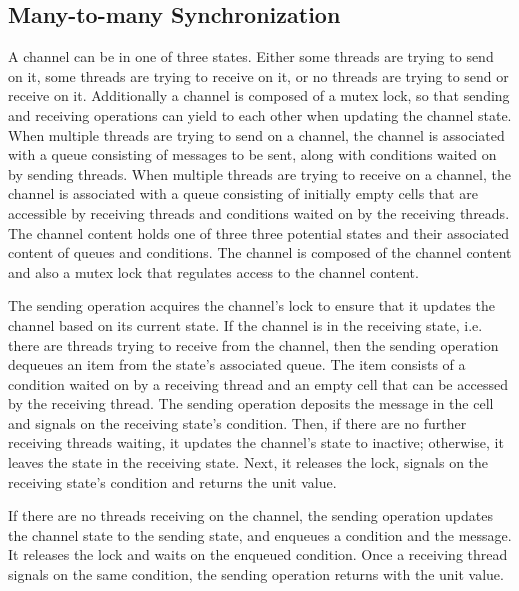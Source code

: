 \documentclass[10pt]{article}
\begin{document}
\subsection{Many-to-many Synchronization}
A channel can be in one of three states.  Either some threads are trying to send on it,
some threads are trying to receive on it, or no threads are trying to send or receive on it.
Additionally a channel is composed of a mutex lock,
so that sending and receiving operations can yield
to each other when updating the channel state. When multiple threads are trying to send on a
channel, the channel is associated with a queue consisting of messages to be sent, along with
conditions waited on by sending threads. When multiple threads are trying to receive on a
channel, the channel is associated with a queue consisting of
initially empty cells that are accessible by receiving threads and
conditions waited on by the receiving threads.
The channel content holds one of three three potential states and their
associated content of queues and conditions.
The channel is composed of the channel content and also a mutex lock that regulates access to
the channel content.

The sending operation acquires the channel's lock to
ensure that it updates the channel based on
its current state.  If the channel is in the receiving state,
i.e. there are threads trying to receive from the channel,
then the sending operation dequeues an item from the state's associated queue.
The item consists of a condition waited on by a receiving thread and an empty cell
that can be accessed by the receiving thread.
The sending operation deposits the message in the cell and signals on the receiving state's condition.
Then, if there are no further receiving threads waiting, it updates the channel's state to inactive; otherwise,
it leaves the state in the receiving state.
Next, it releases the lock, signals on the receiving state's condition and returns the unit value.

If there are no threads receiving on the
channel, the sending operation updates the channel state to the sending state,
and enqueues a condition and the message.
It releases the lock and waits on the enqueued condition.
Once a receiving thread signals on the same condition,
the sending operation returns with the unit value.
\end{document}
